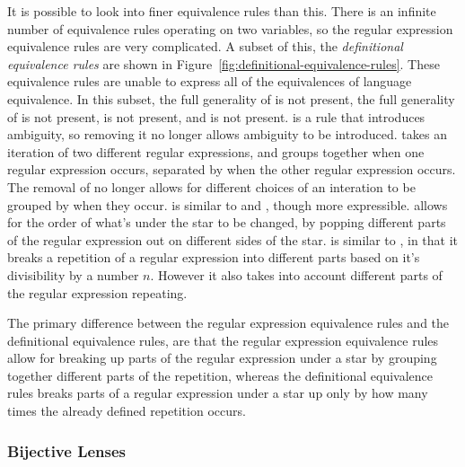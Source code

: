 \documentclass[numbers]{sigplanconf}
\begin{document}
It is possible to look into finer equivalence rules than this.  There is an
infinite number of equivalence rules operating on two variables, so the regular
expression equivalence rules are very complicated.  A subset of
this, the \textit{definitional equivalence rules} are shown in
Figure~\ref{fig:definitional-equivalence-rules}.  These equivalence rules are
unable to express all of the equivalences of language equivalence.  In this
subset, the full generality of \SumstarRule{} is not present, the full
generality of \DicyclicityRule{} is not present, \StarstarRule{} is not present,
and \SumstarRule{} is not present.  \StarstarRule{} is a rule that introduces
ambiguity, so removing it no longer allows ambiguity to be introduced.  \SumstarRule{} takes an iteration of two
different regular expressions, and groups together when one regular expression occurs,
separated by when the other regular expression occurs.  The
removal of \SumstarRule{} no longer allows for different choices of an
interation to be grouped by when they occur.  \ProductstarRule{} is similar to
\UnrollstarLeftRule{} and \UnrollstarRightRule{}, though more expressible.
\ProductstarRule{}
allows for the order of what's under the star to be changed, by popping
different parts of the regular expression out on different sides of the star.
\DicyclicityRule{} is
similar to \QuotientstarRule{}, in that it breaks a repetition of a regular
expression into different parts based on it's divisibility by a number $n$.  However
it also takes into account different parts of the regular expression repeating.

The primary difference between the regular expression equivalence rules and the
definitional equivalence rules, are that the regular expression equivalence
rules allow for breaking up parts of the regular expression under a star by
grouping together different parts of the repetition, whereas the definitional
equivalence rules breaks parts of a regular expression under a star up only by
how many times the already defined repetition occurs.

\subsubsection{Bijective Lenses}
\end{document}
